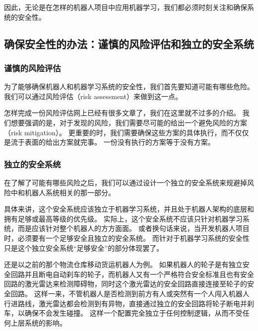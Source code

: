 \documentclass[letterpaper,10pt,english]{sphinxmanual}
\begin{document}
\sphinxAtStartPar
因此，无论是在怎样的机器人项目中应用机器学习，我们都必须时刻关注和确保系统的安全性。


\subsection{确保安全性的办法：谨慎的风险评估和独立的安全系统}
\label{\detokenize{chapter_rl_sys/robot_safety:id2}}

\subsubsection{谨慎的风险评估}
\label{\detokenize{chapter_rl_sys/robot_safety:id3}}
\sphinxAtStartPar
为了能够确保机器人和机器学习系统的安全性，我们首先要知道可能有哪些危险。
我们可以通过风险评估（risk assessment）来做到这一点。

\sphinxAtStartPar
怎样完成一份风险评估网上已经有很多文章了，我们在这里就不过多的介绍。
我们想要强调的是，对于发现的风险，我们需要尽可能的给出一个避免风险的方案（risk
mitigation）。
更重要的时，我们需要确保这些方案的具体执行，而不仅仅是流于表面的给出方案就完事。
一份没有执行的方案等于没有方案。


\subsubsection{独立的安全系统}
\label{\detokenize{chapter_rl_sys/robot_safety:id4}}
\sphinxAtStartPar
在了解了可能有哪些风险之后，我们可以通过设计一个独立的安全系统来规避掉风险中和机器人系统相关的那一部分。

\sphinxAtStartPar
具体来讲，这个安全系统应该独立于机器学习系统，并且处于机器人架构的底层和拥有足够或最高等级的优先级。
实际上，这个安全系统不应该只针对机器学习系统，而是应该针对整个机器人的方方面面。
或者换句话来说，当开发机器人项目时，必须要有一个足够安全且独立的安全系统。
而针对于机器学习系统的安全性只是这个独立安全系统“足够安全”的部分体现罢了。

\sphinxAtStartPar
还是以之前的那个物流仓库移动货运机器人为例。
如果机器人的轮子是有独立安全回路并且断电自动刹车的轮子，而机器人又有一个严格符合安全标准且也有安全回路的激光雷达来检测障碍物，同时这个激光雷达的安全回路直接连接至轮子的安全回路。
这样一来，不管机器人是否检测到前方有人或突然有一个人闯入机器人行进路线，激光雷达都会检测到有异物，直接通过独立的安全回路将轮子断电并刹车，以确保不会发生碰撞。
这样一个配置完全独立于任何控制逻辑，从而不受任何上层系统的影响。
\end{document}
